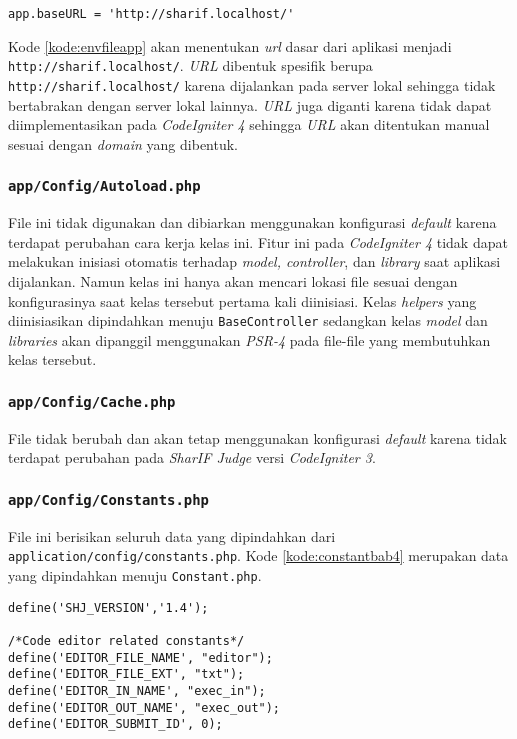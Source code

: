 \begin{lstlisting}[caption= Kode \texttt{application/config/config.php} yang dipindahkan menuju \texttt{.env}, label=kode:envfileapp]
	app.baseURL = 'http://sharif.localhost/'
\end{lstlisting}

Kode \ref{kode:envfileapp} akan menentukan \textit{url} dasar dari aplikasi menjadi \texttt{http://sharif.localhost/}. \textit{URL} dibentuk spesifik berupa \texttt{http://sharif.localhost/} karena dijalankan pada server lokal sehingga tidak bertabrakan dengan server lokal lainnya. \textit{URL} juga diganti karena tidak dapat diimplementasikan pada \textit{CodeIgniter 4} sehingga \textit{URL} akan ditentukan manual sesuai dengan \textit{domain} yang dibentuk.

\subsubsection{\texttt{app/Config/Autoload.php}}
File ini tidak digunakan dan dibiarkan menggunakan konfigurasi \textit{default} karena terdapat perubahan cara kerja kelas ini. Fitur ini pada \textit{CodeIgniter 4} tidak dapat melakukan inisiasi otomatis terhadap \textit{model, controller}, dan \textit{library} saat aplikasi dijalankan. Namun kelas ini hanya akan mencari lokasi file sesuai dengan konfigurasinya saat kelas tersebut pertama kali diinisiasi. Kelas \textit{helpers} yang diinisiasikan dipindahkan menuju \texttt{BaseController} sedangkan kelas \textit{model} dan \textit{libraries} akan dipanggil menggunakan \textit{PSR-4} pada file-file yang membutuhkan kelas tersebut.

\subsubsection{\texttt{app/Config/Cache.php}}
File tidak berubah dan akan tetap menggunakan konfigurasi \textit{default} karena tidak terdapat perubahan pada \textit{SharIF Judge} versi \textit{CodeIgniter 3}.

\subsubsection{\texttt{app/Config/Constants.php}}
File ini berisikan seluruh data yang dipindahkan dari \texttt{application/config/constants.php}. Kode \ref{kode:constantbab4} merupakan data yang dipindahkan menuju \texttt{Constant.php}.

\begin{lstlisting}[caption=Pemindahan kode pada \textit{Constant}, label=kode:constantbab4]
define('SHJ_VERSION','1.4');

/*Code editor related constants*/
define('EDITOR_FILE_NAME', "editor");
define('EDITOR_FILE_EXT', "txt");
define('EDITOR_IN_NAME', "exec_in");
define('EDITOR_OUT_NAME', "exec_out");
define('EDITOR_SUBMIT_ID', 0);
\end{lstlisting}

